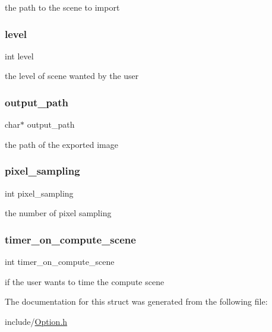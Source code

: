 the path to the scene to import \mbox{\label{struct_option_acf4d33ee4cff36f69b924471174dcb11}} 
\subsubsection{\texorpdfstring{level}{level}}
{\footnotesize\ttfamily int level}

the level of scene wanted by the user \mbox{\label{struct_option_a73c330e3842fe255aa5e7d82bf573289}} 
\subsubsection{\texorpdfstring{output\+\_\+path}{output\_path}}
{\footnotesize\ttfamily char$\ast$ output\+\_\+path}

the path of the exported image \mbox{\label{struct_option_ad7146066ca84f44322c4b8b9b0cf68b3}} 
\subsubsection{\texorpdfstring{pixel\+\_\+sampling}{pixel\_sampling}}
{\footnotesize\ttfamily int pixel\+\_\+sampling}

the number of pixel sampling \mbox{\label{struct_option_a55a22286c25bb0d604e9425da1c0c121}} 
\subsubsection{\texorpdfstring{timer\+\_\+on\+\_\+compute\+\_\+scene}{timer\_on\_compute\_scene}}
{\footnotesize\ttfamily int timer\+\_\+on\+\_\+compute\+\_\+scene}

if the user wants to time the compute scene 

The documentation for this struct was generated from the following file\+:\begin{DoxyCompactItemize}
\item 
include/\hyperlink{_option_8h}{Option.\+h}\end{DoxyCompactItemize}

